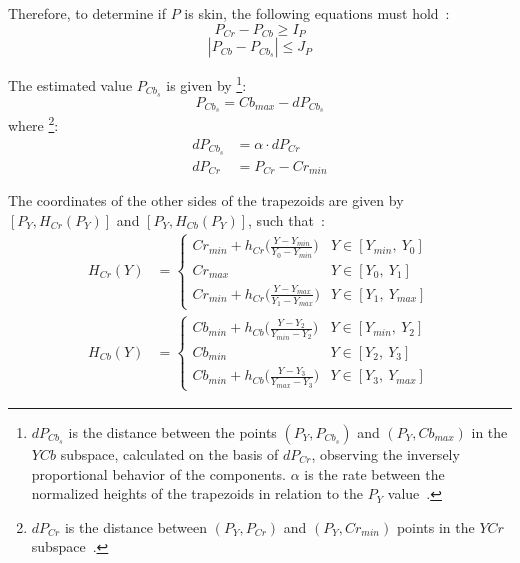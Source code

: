 Therefore, to determine if $P$ is skin, the following equations must hold~\citep{brancati:17}:
\begin{equation}
    P_{Cr} - P_{Cb} \geq I_P
\label{condition_c0}
\end{equation}
\begin{equation}
   |P_{Cb} - P_{Cb_s}| \leq J_P
\label{condition_c1}
\end{equation}

The estimated value $P_{Cb_{s}}$ is given by \footnote{$dP_{Cb_{s}}$ is the distance between the points $(P_Y, P_{Cb_{s}})$ and $(P_Y, Cb_{max})$ in the $YCb$ subspace, calculated on the basis of $dP_{Cr}$, observing the inversely proportional behavior of the components. $\alpha$ is the rate between the normalized heights of the trapezoids in relation to the $P_Y$ value~\citep{brancati:17}.}:
\begin{equation}
    P_{Cb_s} = Cb_{max} - dP_{Cb_s}
\end{equation}
where \footnote{$dP_{Cr}$ is the distance between $(P_Y, P_{Cr})$ and $(P_Y, Cr_{min})$ points in the $YCr$ subspace~\citep{brancati:17}.}:
\begin{align}
    dP_{Cb_s} &= \alpha \cdot dP_{Cr}
    \\
    dP_{Cr} &= P_{Cr} - Cr_{min}
\end{align}

\newpage
The coordinates of the other sides of the trapezoids are given by $[P_Y, H_{Cr}(P_Y)]$ and $[P_Y, H_{Cb}(P_Y)]$, such that~\citep{brancati:17}:
\begin{align}
  H_{Cr}(Y) &=  \begin{cases}
                Cr_{min} + h_{Cr}\big(\frac{Y - Y_{min}}{Y_0 - Y_{min}}\big) & Y \in [Y_{min},\ Y_0] \\
                Cr_{max} & Y \in [Y_0,\ Y_1] \\
                Cr_{min} + h_{Cr}\big(\frac{Y - Y_{max}}{Y_1 - Y_{max}}\big) & Y \in [Y_1,\ Y_{max}]
              \end{cases}
\\
  H_{Cb}(Y) &=  \begin{cases}
                Cb_{min} + h_{Cb}\big(\frac{Y - Y_2}{Y_{min} - Y_2}\big) & Y \in [Y_{min},\ Y_2] \\
                Cb_{min} & Y \in [Y_2,\ Y_3] \\
                Cb_{min} + h_{Cb}\big(\frac{Y - Y_3}{Y_{max} - Y_3}\big) & Y \in [Y_3,\ Y_{max}]
              \end{cases}
\end{align}

